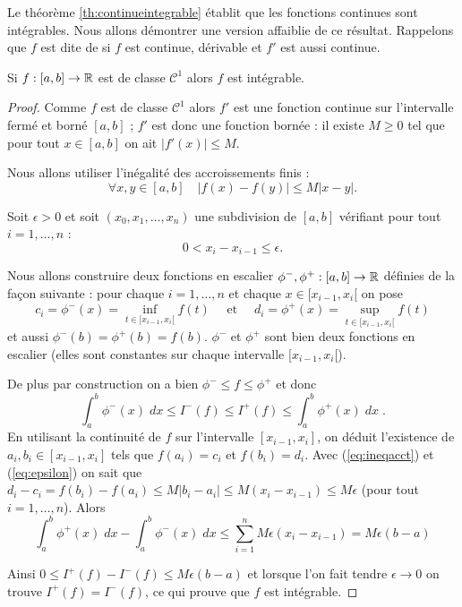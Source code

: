 \documentclass[class=report,crop=false]{standalone}
\begin{document}
Le théorème \ref{th:continueintegrable} établit que les fonctions continues sont intégrables.
Nous allons démontrer une version affaiblie de ce résultat. Rappelons que $f$ est dite de
 si $f$ est continue, dérivable et $f'$ est aussi continue.
\begin{theoreme}
\label{th:c1integrable}
Si $f : [a,b] \to \mathbb{R}$ est de classe $\mathcal{C}^1$ alors $f$ est intégrable.
\end{theoreme}

\begin{proof}
Comme $f$ est de classe  $\mathcal{C}^1$ alors $f'$ est une fonction continue sur l'intervalle fermé et borné $[a,b]$ ;
$f'$ est donc une fonction bornée : il existe $M\ge 0$ tel que pour tout $x \in [a,b]$ on ait $|f'(x)|\le M$.

Nous allons utiliser l'inégalité des accroissements finis :
\begin{equation}
\label{eq:ineqacct}
\tag{$\star$}
\forall x,y \in [a,b] \quad |f(x)-f(y)| \le M |x-y|.
\end{equation}

\medskip

Soit $\epsilon>0$ et soit $(x_0,x_1,\ldots,x_n)$ une subdivision de $[a,b]$ vérifiant pour tout $i=1,\ldots,n$ :
\begin{equation}
\label{eq:epsilon}
\tag{$\star\star$}
0 < x_i-x_{i-1} \le \epsilon.
\end{equation}

 Nous allons construire deux fonctions
en escalier $\phi^-, \phi^+ : [a,b] \to \mathbb{R}$ définies de la façon suivante :
pour chaque $i=1,\ldots,n$ et chaque $x\in[x_{i-1},x_i[$ on pose
$$c_i = \phi^-(x)= \inf_{t\in [x_{i-1},x_i[} f(t) \quad \text{ et } \quad
d_i = \phi^+(x)= \sup_{t\in [x_{i-1},x_i[} f(t)$$
et aussi $\phi^-(b)= \phi^+(b)=f(b)$.
$\phi^-$ et $\phi^+$ sont bien deux fonctions en escalier (elles sont constantes sur chaque intervalle
$[x_{i-1},x_i[$).


\medskip

De plus par construction on a bien $\phi^-\le f \le \phi^+$
et donc
\[
\int_a^b \phi^-(x)\;dx \le I^-(f) \le I^+(f) \le \int_a^b \phi^+(x)\;dx \; .
\]
En utilisant la continuité de $f$ sur l'intervalle $[x_{i - 1}, x_i]$, on déduit l'existence
de $a_i,b_i \in [x_{i -1},x_i]$ tels que $f(a_i)=c_i$ et $f(b_i)=d_i$.
Avec (\ref{eq:ineqacct}) et (\ref{eq:epsilon}) on sait que
$d_i-c_i = f(b_i) - f(a_i) \le M |b_i - a_i| \le M (x_i-x_{i-1}) \le M\epsilon$
(pour tout $i=1,\ldots,n$). Alors
$$\int_a^b \phi^+(x)\;dx - \int_a^b \phi^-(x)\;dx
\le \sum_{i=1}^n M\epsilon(x_i-x_{i-1})=M\epsilon(b-a)$$

Ainsi $0 \le I^+(f) - I^-(f) \le M\epsilon(b-a)$ et lorsque l'on fait tendre $\epsilon \to 0$
on trouve $I^+(f) = I^-(f)$, ce qui prouve que $f$ est intégrable.
\end{proof}
\end{document}
